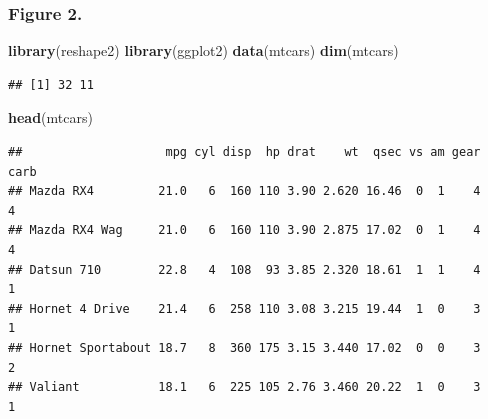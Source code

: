 \documentclass[]{article}
\newenvironment{Shaded}{\begin{snugshade}}{\end{snugshade}}
\newcommand{\KeywordTok}[1]{\textcolor[rgb]{0.13,0.29,0.53}{\textbf{#1}}}
\newcommand{\NormalTok}[1]{#1}
\begin{document}
\hypertarget{figure-2.}{%
\subsubsection{Figure 2.}\label{figure-2.}}

\begin{Shaded}
\begin{Highlighting}[]
\KeywordTok{library}\NormalTok{(reshape2)}
\KeywordTok{library}\NormalTok{(ggplot2)}
\KeywordTok{data}\NormalTok{(mtcars)}
\KeywordTok{dim}\NormalTok{(mtcars)}
\end{Highlighting}
\end{Shaded}

\begin{verbatim}
## [1] 32 11
\end{verbatim}

\begin{Shaded}
\begin{Highlighting}[]
\KeywordTok{head}\NormalTok{(mtcars)}
\end{Highlighting}
\end{Shaded}

\begin{verbatim}
##                    mpg cyl disp  hp drat    wt  qsec vs am gear carb
## Mazda RX4         21.0   6  160 110 3.90 2.620 16.46  0  1    4    4
## Mazda RX4 Wag     21.0   6  160 110 3.90 2.875 17.02  0  1    4    4
## Datsun 710        22.8   4  108  93 3.85 2.320 18.61  1  1    4    1
## Hornet 4 Drive    21.4   6  258 110 3.08 3.215 19.44  1  0    3    1
## Hornet Sportabout 18.7   8  360 175 3.15 3.440 17.02  0  0    3    2
## Valiant           18.1   6  225 105 2.76 3.460 20.22  1  0    3    1
\end{verbatim}
\end{document}
